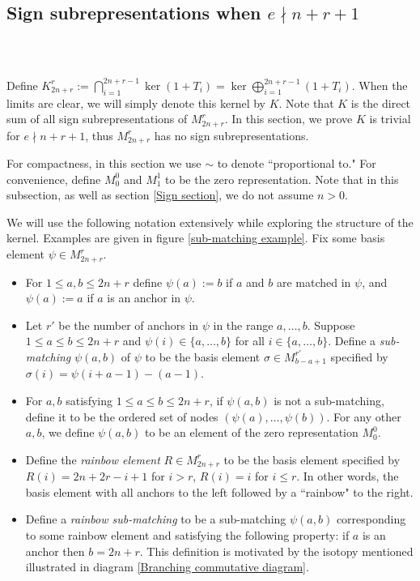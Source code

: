 \documentclass{amsart}
\begin{document}
\subsection{Sign subrepresentations when $e\nmid n+r+1$}\,
\label{kernel}

$\ $


Define $K_{2n+r}^r := \bigcap_{i=1}^{2n+r-1} \ker (1 + T_i) = \ker \bigoplus_{i = 1}^{2n + r - 1} (1 + T_i)$. When the limits are clear, we will simply denote this kernel by $K$. Note that $K$ is the direct sum of all sign subrepresentations of $M_{2n+r}^r$. In this section, we prove $K$ is trivial for $e \nmid n + r + 1$, thus $M_{2n+r}^r$ has no sign subrepresentations.

For compactness, in this section we use $\sim $ to denote ``proportional to." For convenience, define $M_0^0$ and $M_1^1$ to be the zero representation. Note that in this subsection, as well as section \ref{Sign section}, we do not assume $n>0$.

\begin{definition}
	We will use the following notation extensively while exploring the structure of the kernel. Examples are given in figure \ref{sub-matching example}. Fix some basis element $\psi\in M_{2n+r}^r$. 
	
	
	\begin{itemize}
		\item For $1 \leq a,b \leq 2n + r$ define $\psi(a):=b$ if $a$ and $b$ are matched in $\psi$, and $\psi(a):=a$ if $a$ is an anchor in $\psi$. 
		
		
		\item Let $r'$ be the number of anchors in $\psi$ in the range $a,\ldots,b$. Suppose $1\leq a\leq b\leq 2n+r$ and $\psi(i)\in \{a,\ldots,b\}$ for all $i\in \{a,\ldots,b\}$. Define a \emph{sub-matching} $\psi(a,b)$ of $\psi$ to be the basis element $\sigma\in M_{b-a+1}^{r'}$ specified by $\sigma(i)=\psi(i+a-1)-(a-1)$.
		
		\item For $a,b$ satisfying $1\leq a\leq b\leq 2n+r$, if $\psi(a,b)$ is not a sub-matching, define it to be the ordered set of nodes $(\psi(a),\ldots,\psi(b))$. For any other $a,b$, we define $\psi(a,b)$ to be an element of the zero representation $M_0^0$.
		
		\item Define the \emph{rainbow element} $R\in M_{2n+r}^r$ to be the basis element specified by $R(i)=2n+2r-i+1$ for $i>r$, $R(i)=i$ for $i\leq r$. In other words, the basis element with all anchors to the left followed by a ``rainbow" to the right.
		
		\item Define a \emph{rainbow sub-matching} to be a sub-matching $\psi(a,b)$ corresponding to some rainbow element and satisfying the following property: if $a$ is an anchor then $b=2n+r$. This definition is motivated by the isotopy mentioned illustrated in diagram \ref{Branching commutative diagram}.
	\end{itemize}
	
	\label{sub-matchings}
\end{definition}
\end{document}
